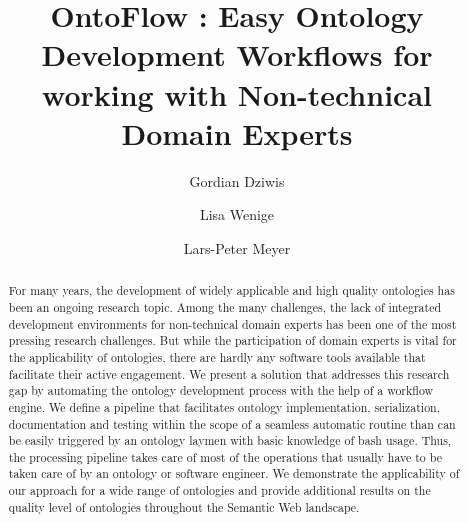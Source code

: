 \documentclass[sigconf]{acmart}
\begin{document}
\title{OntoFlow : Easy Ontology Development Workflows for working with Non-technical Domain Experts}

\author{Gordian Dziwis}
\authornote{}
\author{Lisa Wenige}
\authornotemark[1]
\author{Lars-Peter Meyer}
\authornotemark[1]

\renewcommand{\shortauthors}{Dziwis, Wenige and Meyer}

\begin{abstract}
  For many years, the development of widely applicable and high quality ontologies has been an ongoing research topic. Among the many challenges, the lack of integrated development environments for non-technical domain experts has been one of the most pressing research challenges. But while the participation of domain experts is vital for the applicability of ontologies, there are hardly any software tools available that facilitate their active engagement. We present a solution that addresses this research gap by automating the ontology development process with the help of a workflow engine. We define a pipeline that facilitates ontology implementation, serialization, documentation and testing within the scope of a seamless automatic routine than can be easily triggered by an ontology laymen with basic knowledge of bash usage. Thus, the processing pipeline takes care of most of the operations that usually have to be taken care of by an ontology or software engineer. We demonstrate the applicability of our approach for a wide range of ontologies and provide additional results on the quality level of ontologies throughout the Semantic Web landscape.
\end{abstract}
\end{document}
